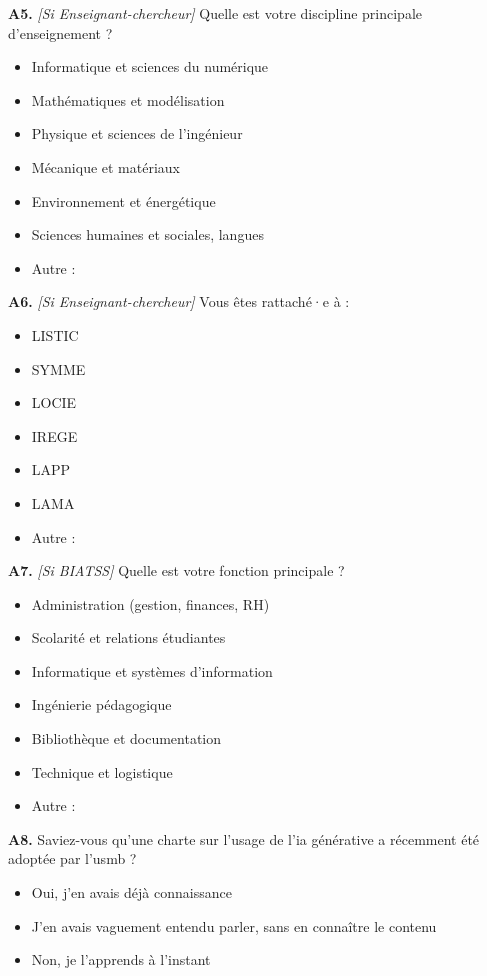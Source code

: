 \textbf{A5.} \textit{[Si Enseignant-chercheur]} Quelle est votre discipline principale d'enseignement ?
\begin{itemize}[label=$\square$, leftmargin=1.5cm]
  \item Informatique et sciences du numérique
  \item Mathématiques et modélisation
  \item Physique et sciences de l'ingénieur
  \item Mécanique et matériaux
  \item Environnement et énergétique
  \item Sciences humaines et sociales, langues
  \item Autre : \underline{\hspace{4cm}}
\end{itemize}

\textbf{A6.} \textit{[Si Enseignant-chercheur]} Vous êtes rattaché·e à :
\begin{itemize}[label=$\square$, leftmargin=1.5cm]
  \item LISTIC
  \item SYMME
  \item LOCIE
  \item IREGE
  \item LAPP
  \item LAMA
  \item Autre : \underline{\hspace{4cm}}
\end{itemize}

\textbf{A7.} \textit{[Si BIATSS]} Quelle est votre fonction principale ?
\begin{itemize}[label=$\square$, leftmargin=1.5cm]
  \item Administration (gestion, finances, RH)
  \item Scolarité et relations étudiantes
  \item Informatique et systèmes d'information
  \item Ingénierie pédagogique
  \item Bibliothèque et documentation
  \item Technique et logistique
  \item Autre : \underline{\hspace{4cm}}
\end{itemize}

\textbf{A8.} Saviez-vous qu'une charte sur l'usage de l'\gls{ia} générative a récemment été adoptée par l'\gls{usmb} ?
\begin{itemize}[label=$\square$, leftmargin=1.5cm]
  \item Oui, j'en avais déjà connaissance
  \item J'en avais vaguement entendu parler, sans en connaître le contenu
  \item Non, je l'apprends à l'instant
\end{itemize}

